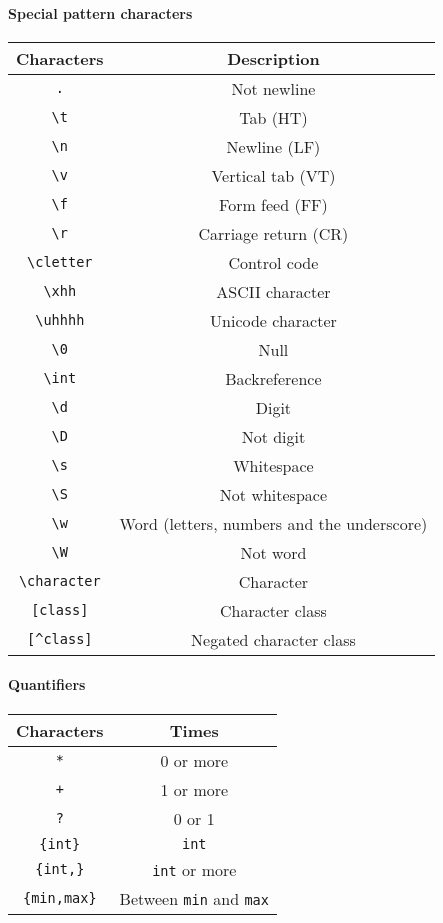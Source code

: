 \paragraph{Special pattern characters}
\begin{center}
	\begin{tabular}{|c|c|}
		\hline
		Characters			&	Description\\
		\hline
		\verb!.!			&	Not newline\\
		\hline
		\verb!\t!			&	Tab (HT)\\
		\hline
		\verb!\n!			&	Newline (LF)\\
		\hline
		\verb!\v!			&	Vertical tab (VT)\\
		\hline
		\verb!\f!			&	Form feed (FF)	\\
		\hline
		\verb!\r!			&	Carriage return (CR)\\
		\hline
		\verb!\cletter!		&	Control code	\\
		\hline
		\verb!\xhh!			&	ASCII character	\\
		\hline
		\verb!\uhhhh!		&	Unicode character\\
		\hline
		\verb!\0!			&	Null			\\
		\hline
		\verb!\int!			&	Backreference\\
		\hline
		\verb!\d!			&	Digit		\\
		\hline
		\verb!\D!			&	Not digit\\
		\hline
		\verb!\s!			&	Whitespace\\
		\hline
		\verb!\S!			&	Not whitespace\\
		\hline
		\verb!\w!			&	Word (letters, numbers and the underscore)\\
		\hline
		\verb!\W!			&	Not word\\
		\hline
		\verb!\character!	&	Character		\\
		\hline
		\verb![class]!		&	Character class\\
		\hline
		\verb![^class]!		&	Negated character class	\\
		\hline
	\end{tabular}
\end{center}
\paragraph{Quantifiers}
\begin{center}
	\begin{tabular}{|c|c|}
		\hline
		Characters			&	Times			\\
		\hline
		\verb!*!			&	0 or more			\\
		\hline
		\verb!+!			&	1 or more				\\
		\hline
		\verb!?!			&	0 or 1				\\
		\hline
		\verb!{int}!		&	\verb!int!		\\
		\hline
		\verb!{int,}!		&	\verb!int! or more				\\
		\hline
		\verb!{min,max}!	&	Between \verb!min! and \verb!max!	\\
		\hline
	\end{tabular}
\end{center}

